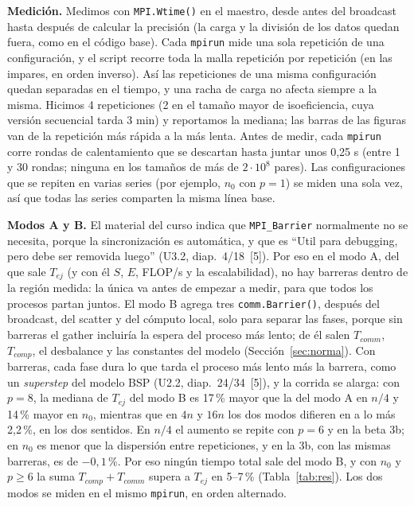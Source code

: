\documentclass[11pt,a4paper]{article}
\begin{document}
\textbf{Medición.} Medimos con \texttt{MPI.Wtime()} en el maestro, desde antes del broadcast hasta después de calcular la precisión (la carga y la división de los datos quedan fuera, como en el código base). Cada \texttt{mpirun} mide una sola repetición de una configuración, y el script recorre toda la malla repetición por repetición (en las impares, en orden inverso). Así las repeticiones de una misma configuración quedan separadas en el tiempo, y una racha de carga no afecta siempre a la misma. Hicimos 4 repeticiones (2 en el tamaño mayor de isoeficiencia, cuya versión secuencial tarda 3 min) y reportamos la mediana; las barras de las figuras van de la repetición más rápida a la más lenta. Antes de medir, cada \texttt{mpirun} corre rondas de calentamiento que se descartan hasta juntar unos 0,25 s (entre 1 y 30 rondas; ninguna en los tamaños de más de $2\cdot 10^8$ pares). Las configuraciones que se repiten en varias series (por ejemplo, $n_0$ con $p = 1$) se miden una sola vez, así que todas las series comparten la misma línea base. 

\textbf{Modos A y B.} El material del curso indica que \texttt{MPI\_Barrier} normalmente no se necesita, porque la sincronización es automática, y que es ``Util para debugging, pero debe ser removida luego'' (U3.2, diap.~4/18~[5]). Por eso en el modo A, del que sale $T_{ej}$ (y con él $S$, $E$, FLOP/s y la escalabilidad), no hay barreras dentro de la región medida: la única va antes de empezar a medir, para que todos los procesos partan juntos. El modo B agrega tres \texttt{comm.Barrier()}, después del broadcast, del scatter y del cómputo local, solo para separar las fases, porque sin barreras el gather incluiría la espera del proceso más lento; de él salen $T_{comm}$, $T_{comp}$, el desbalance y las constantes del modelo (Sección~\ref{sec:norma}). Con barreras, cada fase dura lo que tarda el proceso más lento más la barrera, como un \textit{superstep} del modelo BSP (U2.2, diap.~24/34~[5]), y la corrida se alarga: con $p = 8$, la mediana de $T_{ej}$ del modo B es 17\,\% mayor que la del modo A en $n/4$ y 14\,\% mayor en $n_0$, mientras que en $4n$ y $16n$ los dos modos difieren en a lo más 2,2\,\%, en los dos sentidos. En $n/4$ el aumento se repite con $p = 6$ y en la beta 3b; en $n_0$ es menor que la dispersión entre repeticiones, y en la 3b, con las mismas barreras, es de $-0{,}1$\,\%. Por eso ningún tiempo total sale del modo B, y con $n_0$ y $p \ge 6$ la suma $T_{comp} + T_{comm}$ supera a $T_{ej}$ en 5--7\,\% (Tabla~\ref{tab:res}). Los dos modos se miden en el mismo \texttt{mpirun}, en orden alternado.
\end{document}
